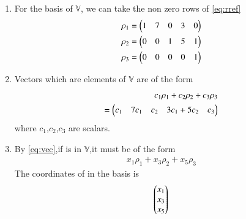 \documentclass[journal,12pt,twocolumn]{IEEEtran}
\begin{document}
\begin{enumerate}[label=\alph*.]
\item For the basis of $\mathbb{V}$, we can take the non zero rows of \eqref{eq:rref} \\
\begin{align}
    \rho_1=\begin{pmatrix}1&7&0&3&0\end{pmatrix} \\
    \rho_2=\begin{pmatrix}0&0&1&5&1\end{pmatrix}\\
    \rho_3=\begin{pmatrix}0&0&0&0&1\end{pmatrix}
\end{align}
\item Vectors which are elements of $\mathbb{V}$  are of the form
\begin{align}
    c_1\rho_1+c_2\rho_2+c_3\rho_3 \nonumber\\
    =\begin{pmatrix}c_1&7c_1&c_2&3c_1+5c_2&c_3\end{pmatrix} \label{eq:vec}
\end{align}
where $c_1$,$c_2$,$c_3$ are scalars.
\item By \eqref{eq:vec},if  is in $\mathbb{V}$,it must be of the form
\begin{align}
    x_1\rho_1+x_3\rho_2+x_5\rho_3
\end{align}
The coordinates of  in the  basis is
\begin{align}
    \begin{pmatrix}x_1\\x_3\\x_5\end{pmatrix}
\end{align}
\end{enumerate}
\end{document}
